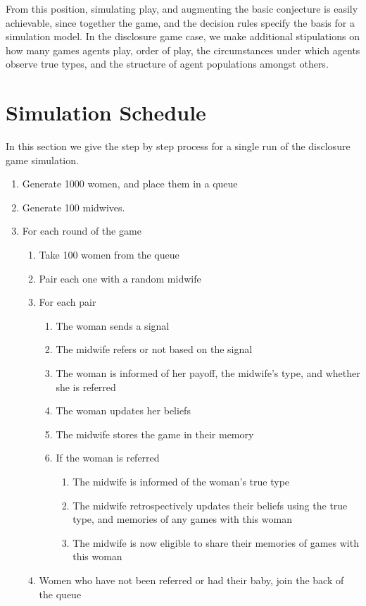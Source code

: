\documentclass[graybox]{svmult}
\begin{document}
From this position, simulating play, and augmenting the basic conjecture is easily achievable, since together the game, and the decision rules specify the basis for a simulation model. In the disclosure game case, we make additional stipulations on how many games agents play, order of play, the circumstances under which agents observe true types, and the structure of agent populations amongst others.  
\section{Simulation Schedule}
\label{app:sim_schedule}

In this section we give the step by step process for a single run of the disclosure game simulation.

\begin{enumerate}
\item Generate 1000 women, and place them in a queue
\item Generate 100 midwives.
\item For each round of the game
\begin{enumerate}
	\item Take 100 women from the queue
	\item Pair each one with a random midwife
	\item For each pair
	\begin{enumerate}
		\item The woman sends a signal
		\item The midwife refers or not based on the signal
		\item The woman is informed of her payoff, the midwife's type, and whether she is referred
		\item The woman updates her beliefs
		\item The midwife stores the game in their memory
		\item If the woman is referred
		\begin{enumerate}
			\item The midwife is informed of the woman's true type
			\item The midwife retrospectively updates their beliefs using the true type, and memories of any games with this woman
			\item The midwife is now eligible to share their memories of games with this woman
		\end{enumerate}
	\end{enumerate}
	\item Women who have not been referred or had their baby, join the back of the queue

\end{enumerate}
\end{enumerate}
\end{document}
